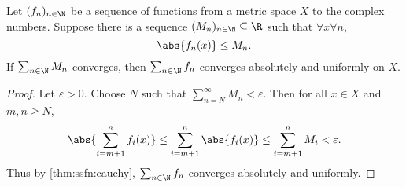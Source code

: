 \begin{exercise*} \label{thm:ssfn:mtest}
    Let $(f_n)_{n \in \N}$ be a sequence of functions from a metric space
    $X$ to the complex numbers.
    Suppose there is a sequence $(M_n)_{n \in \N} \subseteq \R$
    such that $\forall x \forall n$, \[
        \abs{f_n(x)} \le M_n.
    \] If $\sum_{n \in \N} M_n$ converges, then $\sum_{n \in \N} f_n$
    converges absolutely and uniformly on $X$.
\end{exercise*}
\begin{proof}
    Let $\varepsilon > 0$.
    Choose $N$ such that $\sum_{n = N}^{\infty} M_n < \varepsilon$.
    Then for all $x \in X$ and $m, n \ge N$, \[
        \abs{\sum_{i = m+1}^n f_i(x)}
            \le \sum_{i = m+1}^n \abs{f_i(x)}
            \le \sum_{i = m+1}^n M_i
            < \varepsilon.
    \] Thus by \cref{thm:ssfn:cauchy}, $\sum_{n \in \N} f_n$ converges
    absolutely and uniformly.
\end{proof}
